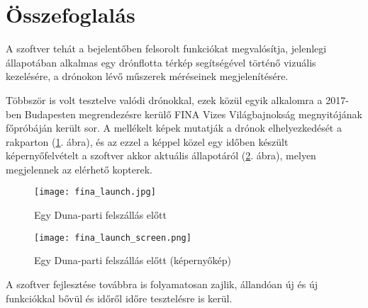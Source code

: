 \section{Összefoglalás}

A szoftver tehát a bejelentőben felsorolt funkciókat megvalósítja, jelenlegi
állapotában alkalmas egy drónflotta térkép segítségével történő vizuális
kezelésére, a drónokon lévő műszerek méréseinek megjelenítésére.

Többször is volt tesztelve valódi drónokkal, ezek közül egyik alkalomra a
2017-ben Budapesten megrendezésre kerülő FINA Vizes Világbajnokság megnyitójának
főpróbáján került sor. A mellékelt képek mutatják a drónok elhelyezkedését a
rakparton (\ref{fig:fina_launch}. ábra), és az ezzel a képpel közel egy időben készült
képernyőfelvételt a szoftver akkor aktuális állapotáról
(\ref{fig:fina_launch_screen}. ábra), melyen megjelennek az elérhető kopterek.

\begin{figure}[H]
  \center
  \texttt{[image: fina\_launch.jpg]}
  \caption{Egy Duna-parti felszállás előtt}
  \label{fig:fina_launch}
\end{figure}

\begin{figure}[H]
  \center
  \texttt{[image: fina\_launch\_screen.png]}
  \caption{Egy Duna-parti felszállás előtt (képernyőkép)}
  \label{fig:fina_launch_screen}
\end{figure}

A szoftver fejlesztése továbbra is folyamatosan zajlik, állandóan új és új
funkciókkal bővül és időről időre tesztelésre is kerül.
